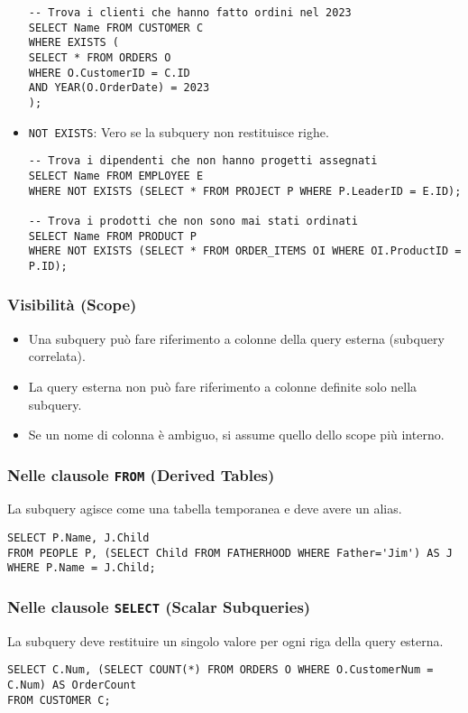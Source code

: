 \begin{itemize}
\begin{verbatim}
-- Trova i clienti che hanno fatto ordini nel 2023
SELECT Name FROM CUSTOMER C
WHERE EXISTS (
SELECT * FROM ORDERS O 
WHERE O.CustomerID = C.ID 
AND YEAR(O.OrderDate) = 2023
);
	\end{verbatim}
	\item \texttt{NOT EXISTS}: Vero se la subquery non restituisce righe.
	\begin{verbatim}
-- Trova i dipendenti che non hanno progetti assegnati
SELECT Name FROM EMPLOYEE E
WHERE NOT EXISTS (SELECT * FROM PROJECT P WHERE P.LeaderID = E.ID);

-- Trova i prodotti che non sono mai stati ordinati
SELECT Name FROM PRODUCT P
WHERE NOT EXISTS (SELECT * FROM ORDER_ITEMS OI WHERE OI.ProductID = P.ID);
	\end{verbatim}
\end{itemize}

\subsubsection{Visibilità (Scope)}
\begin{itemize}
	\item Una subquery può fare riferimento a colonne della query esterna (subquery correlata).
	\item La query esterna non può fare riferimento a colonne definite solo nella subquery.
	\item Se un nome di colonna è ambiguo, si assume quello dello scope più interno.
\end{itemize}

\subsubsection{Nelle clausole \texttt{FROM} (Derived Tables)}
La subquery agisce come una tabella temporanea e deve avere un alias.
\begin{verbatim}
SELECT P.Name, J.Child
FROM PEOPLE P, (SELECT Child FROM FATHERHOOD WHERE Father='Jim') AS J
WHERE P.Name = J.Child;
\end{verbatim}

\subsubsection{Nelle clausole \texttt{SELECT} (Scalar Subqueries)}
La subquery deve restituire un singolo valore per ogni riga della query esterna.
\begin{verbatim}
SELECT C.Num, (SELECT COUNT(*) FROM ORDERS O WHERE O.CustomerNum = C.Num) AS OrderCount
FROM CUSTOMER C;
\end{verbatim}

